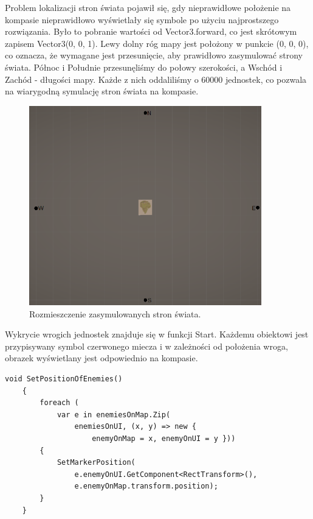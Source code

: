 Problem lokalizacji stron świata pojawił się, gdy nieprawidłowe położenie na kompasie nieprawidłowo wyświetlały się symbole po użyciu najprostszego rozwiązania. Było to pobranie wartości od Vector3.forward, co jest skrótowym zapisem Vector3(0, 0, 1). Lewy dolny róg mapy jest położony w punkcie (0, 0, 0), co oznacza, że wymagane jest przesunięcie, aby prawidłowo zasymulować strony świata. Północ i Południe przesunęliśmy do połowy szerokości, a Wschód i Zachód - długości mapy. Każde z nich oddaliliśmy o 60000 jednostek, co pozwala na wiarygodną symulację stron świata na kompasie.
\begin{figure}[htbp]
    \centering
    \includegraphics[width=0.9\textwidth]{images/ui/strony_swiata.png}
    \caption{Rozmieszczenie zasymulowanych stron świata.}\label{fig:world_sides}
\end{figure}

Wykrycie wrogich jednostek znajduje się w funkcji Start. Każdemu obiektowi jest przypisywany symbol czerwonego miecza i w zależności od położenia wroga, obrazek wyświetlany jest odpowiednio na kompasie.
\begin{lstlisting}[caption=Fragment kodu odpowiedzialny za połączenie wrogich obiektów na mapie z symbolami wyświetlonymi na kompasie]
    void SetPositionOfEnemies()
    {
        foreach (
            var e in enemiesOnMap.Zip(
                enemiesOnUI, (x, y) => new { 
                    enemyOnMap = x, enemyOnUI = y }))
        {
            SetMarkerPosition(
                e.enemyOnUI.GetComponent<RectTransform>(),
                e.enemyOnMap.transform.position);
        }
    }
\end{lstlisting}